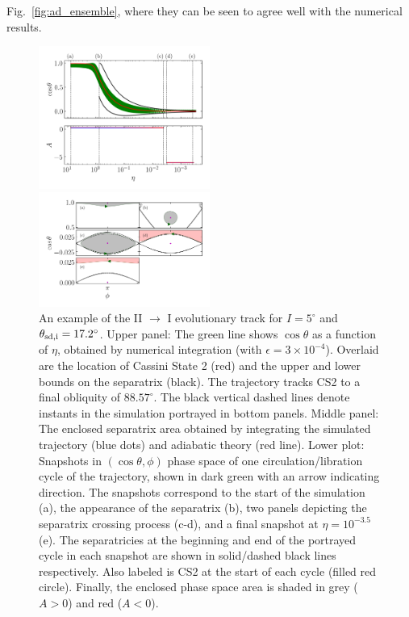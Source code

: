 \documentclass[
        fleqn,
        usenatbib,
    ]{mnras}
\newcommand*{\p}[1]{\left(#1\right)}
\begin{document}
Fig.~\ref{fig:ad_ensemble}, where they can be seen to agree well with the
numerical results.
\begin{figure}
    \centering
    \includegraphics[width=0.5\textwidth]{plots_diskdisp/3testo21.png}

    \includegraphics[width=0.5\textwidth]{plots_diskdisp/3testo21_subplots.png}
    \caption{An example of the II $\to$ I evolutionary track for $I = 5^\circ$
    and $\theta_{\rm sd, i} = 17.2^\circ$. Upper panel: The green line shows
    $\cos \theta$ as a function of $\eta$, obtained by numerical integration
    (with $\epsilon = 3 \times 10^{-4}$). Overlaid are the location of Cassini
    State 2 (red) and the upper and lower bounds on the separatrix (black). The
    trajectory tracks CS2 to a final obliquity of $88.57^\circ$. The black
    vertical dashed lines denote instants in the simulation  portrayed in bottom
    panels. Middle panel: The enclosed separatrix area obtained by integrating
    the simulated trajectory (blue dots) and adiabatic theory (red line). Lower
    plot: Snapshots in $\p{\cos \theta, \phi}$ phase space of one
    circulation/libration cycle of the trajectory, shown in dark green with an
    arrow indicating direction. The snapshots correspond to the start of the
    simulation (a), the appearance of the separatrix (b), two panels depicting
    the separatrix crossing process (c-d), and a final snapshot at $\eta =
    10^{-3.5}$ (e). The separatricies at the beginning and end of the portrayed
    cycle in each snapshot are shown in solid/dashed black lines respectively.
    Also labeled is CS2 at the start of each cycle (filled red circle). Finally,
    the enclosed phase space area is shaded in grey ($A > 0$) and red ($A <
    0$).}\label{fig:ad_21}
\end{figure}
\end{document}
